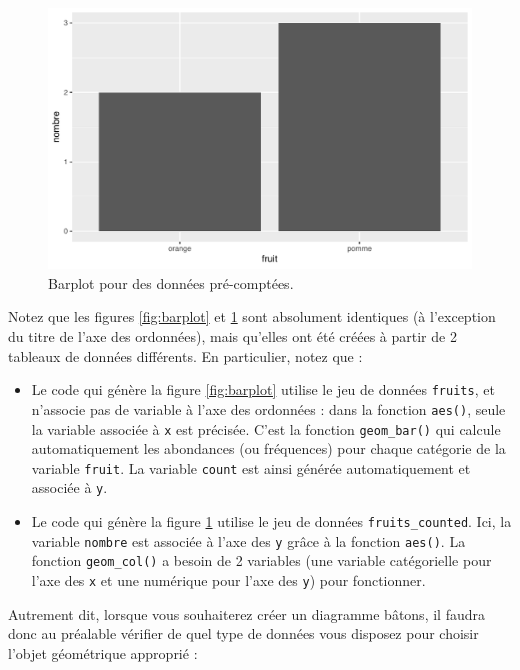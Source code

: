 \documentclass[
  a4paper,
]{article}
\providecommand{\tightlist}{%
  \setlength{\itemsep}{0pt}\setlength{\parskip}{0pt}}
\begin{document}
\begin{figure}[htpb]

{\centering \includegraphics[width=0.9\linewidth]{figure/barplotcol-1} 

}

\caption{Barplot pour des données pré-comptées.}\label{fig:barplotcol}
\end{figure}

Notez que les figures \ref{fig:barplot} et \ref{fig:barplotcol} sont absolument identiques (à l'exception du titre de l'axe des ordonnées), mais qu'elles ont été créées à partir de 2 tableaux de données différents. En particulier, notez que :

\begin{itemize}
\tightlist
\item
  Le code qui génère la figure \ref{fig:barplot} utilise le jeu de données \texttt{fruits}, et n'associe pas de variable à l'axe des ordonnées : dans la fonction \texttt{aes()}, seule la variable associée à \texttt{x} est précisée. C'est la fonction \texttt{geom\_bar()} qui calcule automatiquement les abondances (ou fréquences) pour chaque catégorie de la variable \texttt{fruit}. La variable \texttt{count} est ainsi générée automatiquement et associée à \texttt{y}.
\item
  Le code qui génère la figure \ref{fig:barplotcol} utilise le jeu de données \texttt{fruits\_counted}. Ici, la variable \texttt{nombre} est associée à l'axe des \texttt{y} grâce à la fonction \texttt{aes()}. La fonction \texttt{geom\_col()} a besoin de 2 variables (une variable catégorielle pour l'axe des \texttt{x} et une numérique pour l'axe des \texttt{y}) pour fonctionner.
\end{itemize}

Autrement dit, lorsque vous souhaiterez créer un diagramme bâtons, il faudra donc au préalable vérifier de quel type de données vous disposez pour choisir l'objet géométrique approprié :
\end{document}
